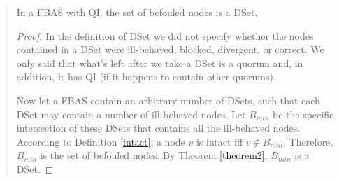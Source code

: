 \begin{quote}
\small
\begin{theorem}
\label{theorem3}
In a FBAS with QI, the set of befouled nodes is a DSet.
\end{theorem}
\begin{proof}
In the definition of DSet we did not specify whether the nodes contained in a DSet were ill-behaved, blocked, divergent, or correct. We only said that what's left after we take a DSet is a quorum and, in addition, it has QI (if it happens to contain other quorums).

\vspace{0.3cm}
Now let a FBAS contain an arbitrary number of DSets, such that each DSet may contain a number of ill-behaved nodes. Let $B_{min}$ be the specific intersection of these DSets that contains all the ill-behaved nodes. According to Definition \ref{intact}, a node $v$ is intact iff $v \notin B_{min}$. Therefore, $B_{min}$ is the set of befouled nodes. By Theorem \ref{theorem2}, $B_{min}$ is a DSet.
\end{proof}
\end{quote}








